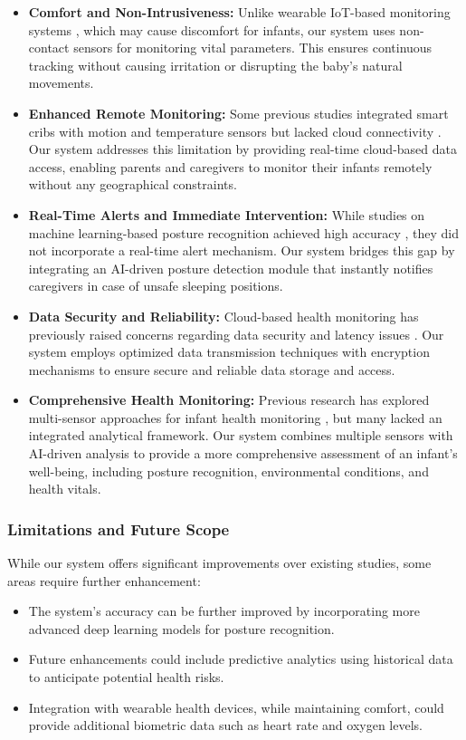 \documentclass[conference]{IEEEtran}
\begin{document}
\begin{itemize}
    \item \textbf{Comfort and Non-Intrusiveness:} Unlike wearable IoT-based monitoring systems \cite{ref1}, which may cause discomfort for infants, our system uses non-contact sensors for monitoring vital parameters. This ensures continuous tracking without causing irritation or disrupting the baby's natural movements.
    
    \item \textbf{Enhanced Remote Monitoring:} Some previous studies integrated smart cribs with motion and temperature sensors but lacked cloud connectivity \cite{ref2}. Our system addresses this limitation by providing real-time cloud-based data access, enabling parents and caregivers to monitor their infants remotely without any geographical constraints.

    \item \textbf{Real-Time Alerts and Immediate Intervention:} While studies on machine learning-based posture recognition achieved high accuracy \cite{ref4, ref5}, they did not incorporate a real-time alert mechanism. Our system bridges this gap by integrating an AI-driven posture detection module that instantly notifies caregivers in case of unsafe sleeping positions.

    \item \textbf{Data Security and Reliability:} Cloud-based health monitoring has previously raised concerns regarding data security and latency issues \cite{ref3, ref6}. Our system employs optimized data transmission techniques with encryption mechanisms to ensure secure and reliable data storage and access.

    \item \textbf{Comprehensive Health Monitoring:} Previous research has explored multi-sensor approaches for infant health monitoring \cite{ref8, ref9}, but many lacked an integrated analytical framework. Our system combines multiple sensors with AI-driven analysis to provide a more comprehensive assessment of an infant’s well-being, including posture recognition, environmental conditions, and health vitals.

\end{itemize}

\subsubsection{Limitations and Future Scope}
While our system offers significant improvements over existing studies, some areas require further enhancement:
\begin{itemize}
    \item The system's accuracy can be further improved by incorporating more advanced deep learning models for posture recognition.
    \item Future enhancements could include predictive analytics using historical data to anticipate potential health risks.
    \item Integration with wearable health devices, while maintaining comfort, could provide additional biometric data such as heart rate and oxygen levels.
\end{itemize}
\end{document}
